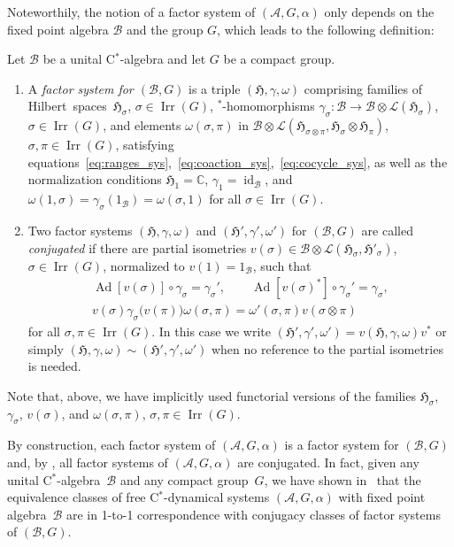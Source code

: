 \documentclass[pdftex]{sigma}
\numberwithin{equation}{section}
\newcommand*{\C}{\mathbb C}		%
\newcommand*{\tensor}{\otimes}		%
\DeclareMathOperator{\id}{id}		%
\DeclareMathOperator{\Ad}{Ad}		%
\newcommand*{\Star}{$^*$\nobreakdash}
\newcommand*{\hilb}{\mathfrak}		%
\newcommand*{\alg}{\mathcal}		%
\newcommand*{\hH}{\hilb{H}}			%
\newcommand*{\one}{1}				%
\newcommand*{\aA}{\alg{A}}			%
\newcommand*{\aB}{\alg{B}} 			%
\newcommand*{\End}{\mathcal{L}} %
\DeclareMathOperator{\Irrep}{Irr} 			%
\begin{document}
Noteworthily, the notion of a factor system of $(\aA, G, \alpha)$ only depends on the fixed point algebra $\aB$ and the group $G$, which leads to the following definition:

\begin{Definition}\label{def:conjugancy}
	Let $\aB$ be a unital C\Star-algebra and let $G$ be a compact group.
	\begin{enumerate}\itemsep=0pt
	\item 		
		A \emph{factor system for $(\aB,G)$} is a triple $(\hH, \gamma, \omega)$ comprising families of Hilbert~spaces~$\hH_\sigma$, $\sigma \in \Irrep(G)$, \Star-homomorphisms $\gamma_\sigma\colon \aB \to \aB \tensor \End(\hH_\sigma)$, $\sigma \in \Irrep(G)$, and elements $\omega(\sigma, \pi)$ in $\aB \tensor \End(\hH_{\sigma \tensor \pi}, \hH_\sigma \tensor \hH_\pi)$, $\sigma, \pi\in \Irrep(G)$, satisfying equations~\eqref{eq:ranges_sys},~\eqref{eq:coaction_sys},~\eqref{eq:cocycle_sys}, as well as the normalization conditions $\hH_1 = \C$, $\gamma_1 = \id_\aB$, and $\omega(1, \sigma) = \gamma_\sigma(\one_\aB) = \omega(\sigma, 1)$ for all $\sigma \in \Irrep(G)$.
	\item
		Two factor systems $(\hH, \gamma, \omega)$ and $(\hH', \gamma', \omega')$ for $(\aB,G)$ are called \emph{conjugated} if there are partial isometries $v(\sigma) \in \aB \tensor \End(\hH_\sigma,\hH'_\sigma)$, $\sigma \in \Irrep(G)$, normalized to $v(1) = \one_\aB$, such that
		\begin{gather*}
			\Ad[v(\sigma)] \circ \gamma_\sigma = \gamma_\sigma',
			\qquad
			\Ad[v(\sigma)^*] \circ \gamma_\sigma' = \gamma_\sigma,		\\
			v(\sigma) \gamma_\sigma\bigl( v(\pi) \bigr) \omega(\sigma, \pi)
			= \omega'(\sigma, \pi) v(\sigma \tensor \pi)
		\end{gather*}
		for all $\sigma, \pi \in \Irrep(G)$.
		In this case we write $(\hH',\gamma', \omega') = v(\hH, \gamma, \omega)v^*$ or simply $(\hH,\gamma, \omega) \sim (\hH', \gamma', \omega')$ when no reference to the partial isometries is needed.
	\end{enumerate}
Note that, above, we have implicitly used functorial versions of the families $\hH_\sigma$, $\gamma_\sigma$, $v(\sigma)$, and $\omega(\sigma, \pi)$, $\sigma, \pi \in \Irrep(G)$.
\end{Definition}

By construction, each factor system of $(\aA,G,\alpha)$ is a factor system for $(\aB,G)$ and, by \cite[Lemma~4.3]{SchWa17c}, all factor systems of $(\aA, G, \alpha)$ are conjugated. In fact, given any unital C\Star\nobreakdash-algebra~$\aB$ and any compact group~$G$, we have shown in~\cite[Section~5]{SchWa17c} that the equivalence classes of free C\Star-dynamical systems $(\aA, G, \alpha)$ with fixed point algebra~$\aB$ are in 1-to-1 correspondence with conjugacy classes of factor systems of $(\aB,G)$.
\end{document}
